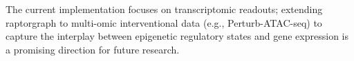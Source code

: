 The current implementation focuses on transcriptomic readouts; extending \gls{raptorgraph} to multi-omic interventional data (e.g., Perturb-ATAC-seq) to capture the interplay between epigenetic regulatory states and gene expression is a promising direction for future research.

%
%
%
%
